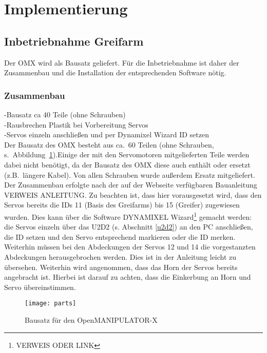 \section{Implementierung}

\subsection {Inbetriebnahme Greifarm}
Der OMX wird als Bausatz geliefert.
Für die Inbetriebnahme ist daher der Zusammenbau und die Installation der entsprechenden Software nötig.
\subsubsection{Zusammenbau}
-Bausatz ca 40 Teile (ohne Schrauben)\\
-Rausbrechen Plastik bei Vorbereitung Servos\\
-Servos einzeln anschließen und per Dynamixel Wizard ID setzen\\
Der Bausatz des OMX besteht aus ca.\ 60 Teilen (ohne Schrauben, s.\ Abbildung~\ref{fig:omxparts}).Einige der mit den Servomotoren mitgelieferten Teile werden dabei nicht benötigt, da der Bausatz des OMX diese auch enthält oder ersetzt (z.B.\ längere Kabel).
Von allen Schrauben wurde außerdem Ersatz mitgeliefert.\\
Der Zusammenbau erfolgte nach der auf der Webseite verfügbaren Bauanleitung VERWEIS ANLEITUNG. Zu beachten ist, dass hier vorausgesetzt wird, dass den Servos bereits die IDs 11 (Basis des Greifarms) bis 15 (Greifer) zugewiesen wurden.
Dies kann über die Software DYNAMIXEL Wizard{\footnote{VERWEIS ODER LINK}} gemacht werden: die Servos einzeln über das U2D2 (s. Abschnitt {\ref{u2d2}}) an den PC anschließen, die ID setzen und den Servo entsprechend markieren oder die ID merken.
Weiterhin müssen bei den Abdeckungen der Servos 12 und 14 die vorgestanzten Abdeckungen herausgebrochen werden.
Dies ist in der Anleitung leicht zu übersehen.
Weiterhin wird angenommen, dass das Horn der Servos bereits angebracht ist.
Hierbei ist darauf zu achten, dass die Einkerbung an Horn und Servo übereinstimmen.
\begin{figure}[ht!]
\centering
\texttt{[image: parts]}
\caption{Bausatz für den OpenMANIPULATOR-X}
\label{fig:omxparts}
\end{figure}
